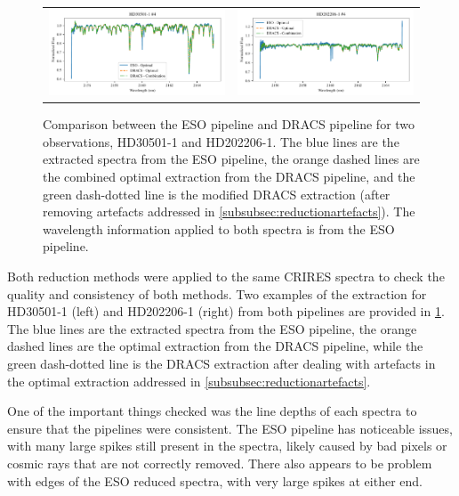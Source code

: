 \begin{figure}
\begin{tabular}{cc}
        \includegraphics[width=0.5\linewidth]{figures/reduction/pipeline_compare/pipeline_compare_HD30501-1_chip_4} & \includegraphics[width=0.5\linewidth]{figures/reduction/pipeline_compare/pipeline_compare_HD202206-1_chip_4}\\
    \end{tabular}
    \caption{Comparison between the {ESO} pipeline and {DRACS} pipeline for two observations, {HD30501-1} and {HD202206-1}.
The blue lines are the extracted spectra from the {ESO} pipeline, the orange dashed lines are the combined optimal extraction from the {DRACS} pipeline, and the green dash-dotted line is the modified {DRACS} extraction (after removing artefacts addressed in \cref{subsubsec:reductionartefacts}).
The wavelength information applied to both spectra is from the {ESO} pipeline.}
    \label{fig:reduction-comparison}
\end{figure}

Both reduction methods were applied to the same {CRIRES} spectra to check the quality and consistency of both methods.
Two examples of the extraction for HD30501-1 (left) and HD202206-1 (right) from both pipelines are provided in \cref{fig:reduction-comparison}.
The blue lines are the extracted spectra from the {ESO} pipeline, the orange dashed lines are the optimal extraction from the {DRACS} pipeline, while the green dash-dotted line is the {DRACS} extraction after dealing with artefacts in the optimal extraction addressed in \cref{subsubsec:reductionartefacts}.

One of the important things checked was the line depths of each spectra to ensure that the pipelines were consistent.
The {ESO} pipeline has noticeable issues, with many large spikes still present in the spectra, likely caused by bad pixels or cosmic rays that are not correctly removed.
There also appears to be problem with edges of the {ESO} reduced spectra, with very large spikes at either end.

